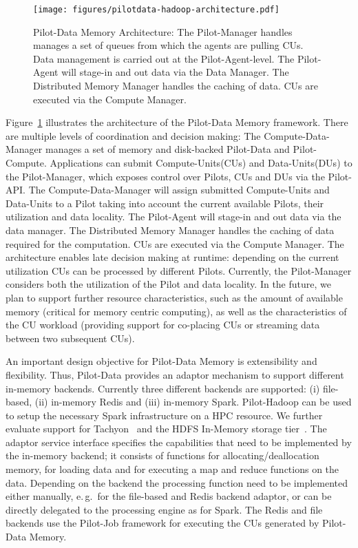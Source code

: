 \documentclass{sig-alternate}
\newcommand{\pilot}{Pilot\xspace}
\newcommand{\pilots}{Pilots\xspace}
\newcommand{\pilotjob}{Pilot-Job\xspace}
\newcommand{\pilotcompute}{Pilot-Compute\xspace}
\newcommand{\pilotdata}{Pilot-Data\xspace}
\newcommand{\pilotdatainmem}{Pilot-Data Memory\xspace}
\newcommand{\computeunits}{Compute-Units\xspace}
\newcommand{\dataunits}{Data-Units\xspace}
\newcommand{\dus}{DUs\xspace}
\newcommand{\cu}{CU\xspace}
\newcommand{\cus}{CUs\xspace}
\begin{document}
\begin{figure}[t]
    \centering
       \texttt{[image: figures/pilotdata-hadoop-architecture.pdf]}
       \caption{\pilotdatainmem Architecture: The \pilot-Manager handles 
       manages a set of queues from which the agents are pulling \cus. Data     
       management is carried out at the \pilot-Agent-level. The \pilot-Agent 
       will stage-in and out data via the Data Manager. The Distributed Memory 
       Manager handles the caching of data. \cus are executed via the Compute 
       Manager.
 }
    \label{fig:figures_pilotdata-hadoop-architecture}
\end{figure}


Figure~\ref{fig:figures_pilotdata-hadoop-architecture} illustrates the
architecture of the \pilotdatainmem framework. There are multiple levels of
coordination and decision making: The Compute-Data-Manager manages a set of
memory and disk-backed \pilotdata and \pilotcompute. Applications can submit
\computeunits (\cus) and \dataunits (\dus) to the \pilot-Manager, which exposes
control over \pilots, \cus and \dus via the \pilot-API. The
Compute-Data-Manager will assign submitted \computeunits and \dataunits to a
\pilot taking into account the current available \pilots, their utilization and
data locality. The \pilot-Agent will stage-in and out data via the data
manager. The Distributed Memory Manager handles the caching of data required
for the computation. \cus are executed via the Compute Manager. The
architecture enables late decision making at runtime: depending on the current
utilization \cus can be processed by different \pilots. Currently, the
\pilot-Manager considers both the utilization of the \pilot and data locality.
In the future, we plan to support further resource characteristics, such as the
amount of available memory (critical for memory centric computing), as well as
the characteristics of the \cu workload (providing support for co-placing \cus
or streaming data between two subsequent \cus).

An important design objective for \pilotdatainmem is extensibility and
flexibility. Thus, \pilotdata provides an adaptor mechanism to support different
in-memory backends. Currently three different backends are supported: (i)
file-based, (ii) in-memory Redis and (iii) in-memory Spark. \pilot-Hadoop can
be used to setup the necessary Spark infrastructure on a HPC resource. We
further evaluate support for Tachyon~\cite{tachyon} and the HDFS In-Memory
storage tier~\cite{hdfs-inmen}. The adaptor service interface specifies the
capabilities that need to be implemented by the in-memory backend; it consists
of functions for allocating/deallocation memory, for loading data and for
executing a map and reduce functions on the data. Depending on the backend the
processing function need to be implemented either manually, e.\,g.\ for the
file-based and Redis backend adaptor, or can be directly delegated to the 
processing engine as for Spark. The Redis and file backends use the \pilotjob 
framework for executing the \cus generated by \pilotdatainmem.
\end{document}
